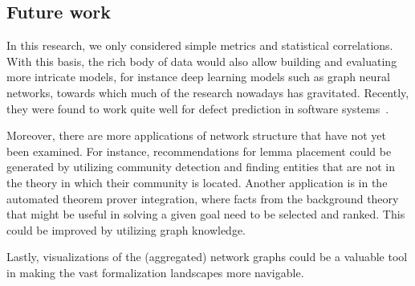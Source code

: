 \subsection{Future work}
In this research,
we only considered simple metrics and statistical correlations.
With this basis, the rich body of data would also allow building and evaluating more intricate models,
for instance deep learning models such as graph neural networks,
towards which much of the research nowadays has gravitated.
Recently, they were found to work quite well for defect prediction in software systems~\cite{GNNSoftwareDefects2022Sikic}.

Moreover, there are more applications of network structure that have not yet been examined.
For instance, recommendations for lemma placement could be generated by utilizing community detection and finding entities that are not in the theory in which their community is located.
Another application is in the automated theorem prover integration,
where facts from the background theory that might be useful in solving a given goal need to be selected and ranked. This could be improved by utilizing graph knowledge.

Lastly, visualizations of the (aggregated) network graphs could be a valuable tool in making the vast formalization landscapes more navigable.